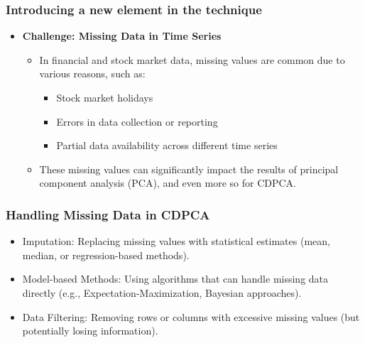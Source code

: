 \documentclass{beamer}
\begin{document}
\begin{frame}
    \frametitle{Introducing a new element in the technique}

    \begin{itemize}
        \item \textbf{Challenge: Missing Data in Time Series}
        \begin{itemize}
            \item In financial and stock market data, missing values are common due to various reasons, such as:
            \begin{itemize}
                \item Stock market holidays
                \item Errors in data collection or reporting
                \item Partial data availability across different time series
            \end{itemize}
            \item These missing values can significantly impact the results of principal component analysis (PCA), and even more so for CDPCA.
        \end{itemize}

    \end{itemize}
\end{frame}

\begin{frame}
    \frametitle{Handling Missing Data in CDPCA}


    \begin{itemize}
        \item Imputation: Replacing missing values with statistical estimates (mean, median, or regression-based methods).
        \item Model-based Methods: Using algorithms that can handle missing data directly (e.g., Expectation-Maximization, Bayesian approaches).
        \item Data Filtering: Removing rows or columns with excessive missing values (but potentially losing information).
    \end{itemize}


\end{frame}
\end{document}
